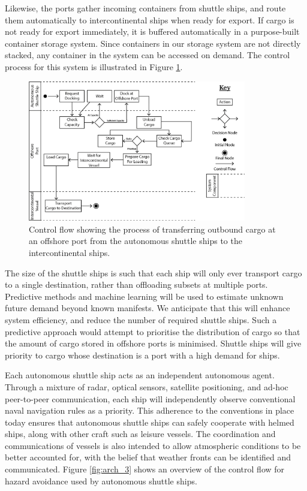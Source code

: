 Likewise, the ports gather incoming containers from shuttle ships, and route them automatically to intercontinental ships when ready for export. If cargo is not ready for export immediately, it is buffered automatically in a purpose-built container storage system. Since containers in our storage system are not directly stacked, any container in the system can be accessed on demand. The control process for this system is illustrated in Figure \ref{fig:arch_2}.

\begin{figure}[h!]
\centering
	\includegraphics[width=0.85\textwidth]{images/arch_2}
	\caption{Control flow showing the process of transferring outbound cargo at an offshore port from the autonomous shuttle ships to the intercontinental ships.}
	\label{fig:arch_2}
\end{figure}

The size of the shuttle ships is such that each ship will only ever transport cargo to a single destination, rather than offloading subsets at multiple ports. Predictive methods and machine learning will be used to estimate unknown future demand beyond known manifests. We anticipate that this will enhance system efficiency, and reduce the number of required shuttle ships. Such a predictive approach would attempt to prioritise the distribution of cargo so that the amount of cargo stored in offshore ports is minimised. Shuttle ships will give priority to cargo whose destination is a port with a high demand for ships.

Each autonomous shuttle ship acts as an independent autonomous agent. Through a mixture of radar, optical sensors, satellite positioning, and ad-hoc peer-to-peer communication, each ship will independently observe conventional naval navigation rules as a priority. This adherence to the conventions in place today ensures that autonomous shuttle ships can safely cooperate with helmed ships, along with other craft such as leisure vessels. The coordination and communications of vessels is also intended to allow atmospheric conditions to be better accounted for, with the belief that weather fronts can be identified and communicated. Figure \ref{fig:arch_3} shows an overview of the control flow for hazard avoidance used by autonomous shuttle ships.


